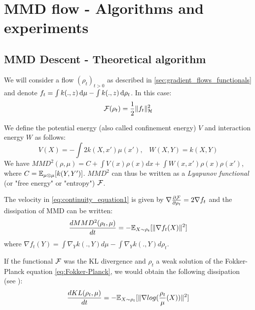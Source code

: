 \section{MMD flow - Algorithms and experiments}\label{sec:mmd_flow}

\subsection{MMD Descent - Theoretical algorithm}

We will consider a flow $(\rho_t)_{t>0}$ as described in \cref{sec:gradient_flows_functionals} and denote $f_t= \int k(.,z)\mathop{}\!\mathrm{d} \mu - \int k(.,z)\mathop{}\!\mathrm{d} \rho_t$. In this case:
\begin{equation}
{{\mathcal F}}(\rho_t)=\frac{1}{2}\|f_t\|^2_{{{\mathcal H}}}
\end{equation} 

We define the potential energy (also called confinement energy) $V$ and interaction energy $W$ as follows:
\begin{equation}
V(X)=-\int 2 k(X,x')\mu(x')\text{,} \quad
W(X,Y)=k(X,Y)
\end{equation}
We have $MMD^2(\rho,\mu)=C+ \int V(x) \rho(x)dx + \int W(x,x')\rho(x)\rho(x')$, where $C={{\mathbb E}}_{\mu\otimes \mu}[k(Y,Y')]$. $MMD^2$ can thus be written as a \textit{Lyapunov functional} (or "free energy" or "entropy") ${{\mathcal F}}$. 


\begin{proposition}\label{prop:mmd_flow}
 The velocity in \eqref{eq:continuity_equation1} is given by $\nabla \frac{\partial{{{\mathcal F}}}}{\partial{\rho_t}}=2 \nabla f_t$ and the dissipation of MMD can be written:  
	\begin{equation}
	\frac{d MMD^2(\rho_t, \mu)}{dt}=-{{\mathbb E}}_{X \sim \rho_t}[\|\nabla f_t(X)\|^2]
	\end{equation}
	where $\nabla f_t(Y)= \int \nabla_{Y}k(.,Y) d\mu -  \int \nabla_{Y}k(.,Y) d\rho_t$.
\end{proposition}

\begin{remark}
	If the functional ${{\mathcal F}}$ was the KL divergence and $\rho_t$ a weak solution of the Fokker-Planck equation \eqref{eq:Fokker-Planck}, we would obtain the following dissipation (see \cite{wibisono2018sampling}):
	\begin{equation}
	\frac{d KL(\rho_t, \mu)}{dt}=-{{\mathbb E}}_{X \sim \rho_t}[\|\nabla log(\frac{\rho_t}{\mu}(X))\|^2]
	\end{equation}
\end{remark}


